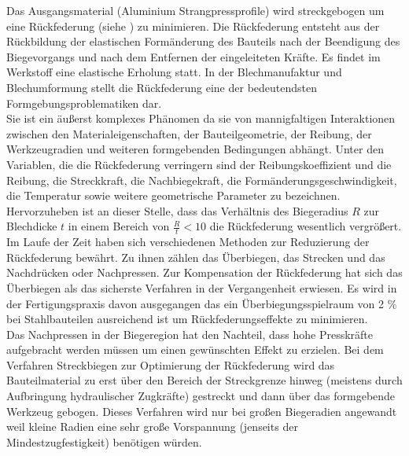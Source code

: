 \documentclass[12pt,a4paper,parskip,twoside,BCOR5mm,headsepline]{scrartcl}
\begin{document}
  
Das Ausgangsmaterial (Aluminium Strangpressprofile) wird streckgebogen um eine Rückfederung (siehe ) zu minimieren.  Die Rückfederung entsteht aus der Rückbildung der elastischen Formänderung des Bauteils nach der Beendigung des Biegevorgangs und nach dem Entfernen der eingeleiteten Kräfte. Es findet im Werkstoff eine elastische Erholung statt. In der Blechmanufaktur und Blechumformung stellt die Rückfederung eine der bedeutendsten Formgebungsproblematiken dar.
\\

 Sie ist ein äußerst komplexes Phänomen da sie von mannigfaltigen Interaktionen zwischen den Materialeigenschaften, der Bauteilgeometrie, der Reibung,  der Werkzeugradien und weiteren formgebenden Bedingungen abhängt. Unter den Variablen, die die Rückfederung verringern sind der Reibungskoeffizient und die Reibung, die Streckkraft, die Nachbiegekraft, die Formänderungsgeschwindigkeit, die Temperatur sowie weitere geometrische Parameter zu bezeichnen. Hervorzuheben ist an dieser Stelle, dass das Verhältnis des Biegeradius $ R $ zur Blechdicke $ t $ in einem Bereich von $ \frac{R}{t} < 10 $ die Rückfederung wesentlich vergrößert. Im Laufe der Zeit haben sich verschiedenen Methoden zur Reduzierung der Rückfederung bewährt. Zu ihnen zählen das Überbiegen, das Strecken und das Nachdrücken oder Nachpressen. Zur Kompensation der Rückfederung hat sich das Überbiegen als das sicherste Verfahren in der Vergangenheit erwiesen. Es wird in der Fertigungspraxis davon ausgegangen das ein Überbiegungsspielraum von 2 \%  bei Stahlbauteilen ausreichend ist um Rückfederungseffekte zu minimieren.\\ Das Nachpressen in der Biegeregion hat den Nachteil, dass hohe Presskräfte aufgebracht werden müssen um einen gewünschten Effekt zu erzielen. Bei dem Verfahren  Streckbiegen zur Optimierung der Rückfederung wird das Bauteilmaterial zu erst über den Bereich der Streckgrenze hinweg (meistens durch Aufbringung hydraulischer Zugkräfte) gestreckt und dann über das formgebende Werkzeug gebogen. Dieses Verfahren wird nur bei großen Biegeradien angewandt weil kleine Radien eine sehr große Vorspannung (jenseits der Mindestzugfestigkeit) benötigen würden.\autocite[16-19]{hmp}\\  
 
\end{document}
